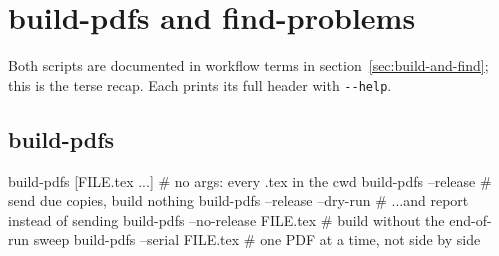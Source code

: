 \section{build-pdfs and find-problems}\label{sec:ref-scripts}

Both scripts are documented in workflow terms in
section~\ref{sec:build-and-find}; this is the terse recap. Each prints its
full header with \texttt{-{}-help}.

\subsection*{build-pdfs}

\begin{manexsource}
build-pdfs [FILE.tex ...]    # no args: every .tex in the cwd
build-pdfs --release         # send due copies, build nothing
build-pdfs --release --dry-run   # ...and report instead of sending
build-pdfs --no-release FILE.tex # build without the end-of-run sweep
build-pdfs --serial FILE.tex     # one PDF at a time, not side by side
\end{manexsource}

